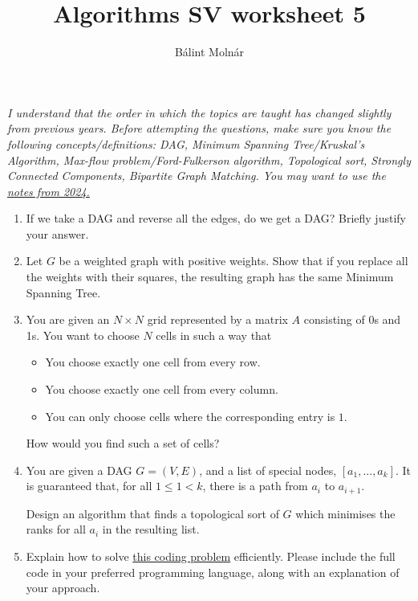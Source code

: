 \documentclass{article}
\title{{Algorithms SV worksheet 5}}
\author{Bálint Molnár}
\begin{document}
\maketitle
 
\emph{I understand that the order in which the topics are taught has changed slightly from previous years. Before attempting the questions, make sure you know the following concepts/definitions: DAG, Minimum Spanning Tree/Kruskal's Algorithm, Max-flow problem/Ford-Fulkerson algorithm, Topological sort, Strongly Connected Components, Bipartite Graph Matching. You may want to use the \href{https://www.cl.cam.ac.uk/teaching/2324/Algorithm1/content/algorithms2.pdf}{notes from 2024.}}

\begin{enumerate}
    \item If we take a DAG and reverse all the edges, do we get a DAG? Briefly justify your answer.

    \item Let $G$ be a weighted graph with positive weights. Show that if you replace all the weights with their squares, the resulting graph has the same Minimum Spanning Tree.

    \item You are given an $N \times N $ grid represented by a matrix $A$ consisting of 0s and 1s. You want to choose $N$ cells in such a way that
    \begin{itemize}
        \item You choose exactly one cell from every row.
        \item You choose exactly one cell from every column.
        \item You can only choose cells where the corresponding entry is $1$.
    \end{itemize}

    How would you find such a set of cells?


    \item You are given a DAG $G=(V,E)$, and a list of special nodes, $[a_1, ..., a_k]$. It is guaranteed that, for all $1 \leq 1 < k$, there is a path from $a_i$ to $a_{i+1}$.

    Design an algorithm that finds a topological sort of $G$ which minimises the ranks for all $a_i$ in the resulting list.


\item Explain how to solve \href{https://cses.fi/problemset/task/1677}{this coding problem} efficiently. Please include the full code in your preferred programming language, along with an explanation of your approach.


\end{enumerate}
\end{document}
